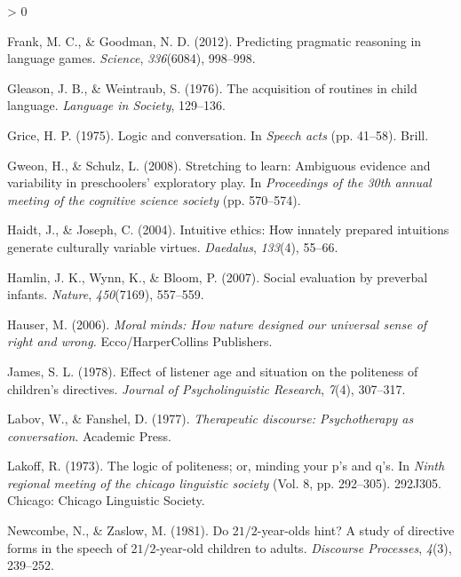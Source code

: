 \documentclass[
  english,
  man,floatsintext]{apa6}
\newlength{\cslhangindent}
\newenvironment{CSLReferences}[2] %
 {%
  \setlength{\parindent}{0pt}
  \ifodd #1 \everypar{\setlength{\hangindent}{\cslhangindent}}\ignorespaces\fi
  \ifnum #2 > 0
  \setlength{\parskip}{#2\baselineskip}
  \fi
 }%
 {}
\begin{document}
\begin{CSLReferences}{1}{0}
\leavevmode\hypertarget{ref-frank2012}{}%
Frank, M. C., \& Goodman, N. D. (2012). Predicting pragmatic reasoning in language games. \emph{Science}, \emph{336}(6084), 998--998.

\leavevmode\hypertarget{ref-gleason1976}{}%
Gleason, J. B., \& Weintraub, S. (1976). The acquisition of routines in child language. \emph{Language in Society}, 129--136.

\leavevmode\hypertarget{ref-grice1975}{}%
Grice, H. P. (1975). Logic and conversation. In \emph{Speech acts} (pp. 41--58). Brill.

\leavevmode\hypertarget{ref-gweon2008}{}%
Gweon, H., \& Schulz, L. (2008). Stretching to learn: Ambiguous evidence and variability in preschoolers' exploratory play. In \emph{Proceedings of the 30th annual meeting of the cognitive science society} (pp. 570--574).

\leavevmode\hypertarget{ref-haidt2004}{}%
Haidt, J., \& Joseph, C. (2004). Intuitive ethics: How innately prepared intuitions generate culturally variable virtues. \emph{Daedalus}, \emph{133}(4), 55--66.

\leavevmode\hypertarget{ref-hamlin2007}{}%
Hamlin, J. K., Wynn, K., \& Bloom, P. (2007). Social evaluation by preverbal infants. \emph{Nature}, \emph{450}(7169), 557--559.

\leavevmode\hypertarget{ref-hauser2006}{}%
Hauser, M. (2006). \emph{Moral minds: How nature designed our universal sense of right and wrong.} Ecco/HarperCollins Publishers.

\leavevmode\hypertarget{ref-james1978}{}%
James, S. L. (1978). Effect of listener age and situation on the politeness of children's directives. \emph{Journal of Psycholinguistic Research}, \emph{7}(4), 307--317.

\leavevmode\hypertarget{ref-labov1977}{}%
Labov, W., \& Fanshel, D. (1977). \emph{Therapeutic discourse: Psychotherapy as conversation}. Academic Press.

\leavevmode\hypertarget{ref-lakoff1973}{}%
Lakoff, R. (1973). The logic of politeness; or, minding your p's and q's. In \emph{Ninth regional meeting of the chicago linguistic society} (Vol. 8, pp. 292--305). 292J305. Chicago: Chicago Linguistic Society.

\leavevmode\hypertarget{ref-newcombe1981}{}%
Newcombe, N., \& Zaslow, M. (1981). Do 2\(1/2\)-year-olds hint? A study of directive forms in the speech of 2\(1/2\)-year-old children to adults. \emph{Discourse Processes}, \emph{4}(3), 239--252.


\end{CSLReferences}
\end{document}
